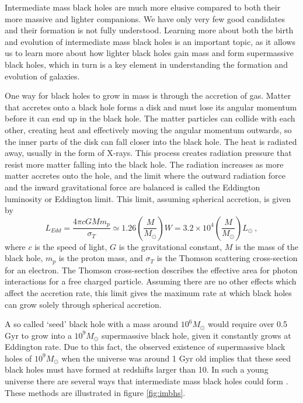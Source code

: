 \documentclass[english, oneside]{HYgradu}
\begin{document}
Intermediate mass black holes are much more elusive compared to both their more massive and lighter companions. We have only very few good candidates and their formation is not fully understood. Learning more about both the birth and evolution of intermediate mass black holes is an important topic, as it allows us to learn more about how lighter black holes gain mass and form supermassive black holes, which in turn is a key element in understanding the formation and evolution of galaxies.

One way for black holes to grow in mass is through the accretion of gas. Matter that accretes onto a black hole forms a disk and must lose its angular momentum before it can end up in the black hole. The matter particles can collide with each other, creating heat and effectively moving the angular momentum outwards, so the inner parts of the disk can fall closer into the black hole. The heat is radiated away, usually in the form of X-rays. This process creates radiation pressure that resist more matter falling into the black hole. The radiation increases as more matter accretes onto the hole, and the limit where the outward radiation force and the inward gravitational force are balanced is called the Eddington luminosity or Eddington limit. This limit, assuming spherical accretion, is given by
\begin{equation}
L_{Edd} = \frac{4 \pi c G M m_p}{\sigma_T} \simeq 1.26 \left( \frac{M}{M_\odot} \right) W = 3.2 \times 10^4 \left( \frac{M}{M_\odot} \right) L_\odot \ ,
\end{equation}
where $c$ is the speed of light, $G$ is the gravitational constant, $M$ is the mass of the black hole, $m_p$ is the proton mass, and $\sigma_T$ is the Thomson scattering cross-section for an electron. The Thomson cross-section describes the effective area for photon interactions for a free charged particle. Assuming there are no other effects which affect the accretion rate, this limit gives the maximum rate at which black holes can grow solely through spherical accretion. 

A so called `seed' black hole with a mass around $10^6 M_\odot$ would require over 0.5 Gyr to grow into a $10^9 M_\odot$ supermassive black hole, given it constantly grows at Eddington rate. Due to this fact, the observed existence of supermassive black holes of $10^9 M_\odot$ when the universe was around 1 Gyr old implies that these seed black holes must have formed at redshifts larger than 10. In such a young universe there are several ways that intermediate mass black holes could form \citep{mezcua:2017}. These methods are illustrated in figure \ref{fig:imbhs}.
\end{document}
